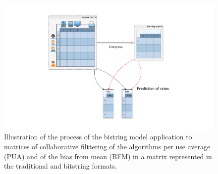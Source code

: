 \documentclass[10pt]{article}
\begin{document}
\begin{figure}[h]
  \centering
  \includegraphics[scale=0.4,trim=5cm 0cm 5cm 0cm,clip]{fig22}
  \caption{Illustration of the process of the bistring model application to matrices of collaborative filttering of the 
algorithms per use average (PUA) and of the bias from mean (BFM) in a matrix represented in the traditional and 
bitstring formats.}
  \label{fig22}
\end{figure}
\end{document}
